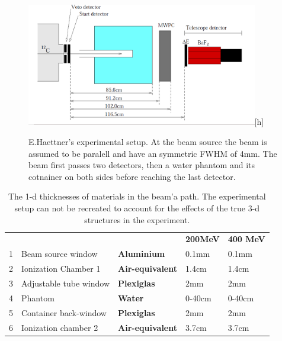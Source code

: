 \begin{figure}[ht] 
\begin{center}
\includegraphics[width=0.9\textwidth]{images/haettnersetup.png}[h]  
\caption{\label{fig:haettnersetup2} E.Haettner's experimental setup. At the beam source the beam is assumed to be paralell and have an symmetric FWHM of 4mm. The beam first passes two detectors, then a water phantom and its cotnainer on both sides before reaching the last detector.}
 \end{center}
 \end{figure}

 \begin{table}[h]
\begin{tabular}{lllll} %
 & & & \textbf{200MeV} & \textbf{400 MeV} \\
1&Beam source window &\textbf{Aluminium}&0.1mm& 0.1mm\\
2&Ionization Chamber 1 &\textbf{Air-equivalent}&1.4cm& 1.4cm\\
3&Adjustable tube window &\textbf{Plexiglas}&2mm&2mm\\
4&Phantom &\textbf{Water}&0-40cm& 0-40cm\\
5&Container back-window &\textbf{Plexiglas}&2mm&2mm\\
6&Ionization chamber 2&\textbf{Air-equivalent}&3.7cm& 3.7cm\\
\end{tabular} 
\caption{\label{fig:SimSetup} The 1-d thicknesses of materials in the beam'a path. The experimental setup can not be recreated to account for the effects of the true 3-d structures in the experiment.}
\end{table}



